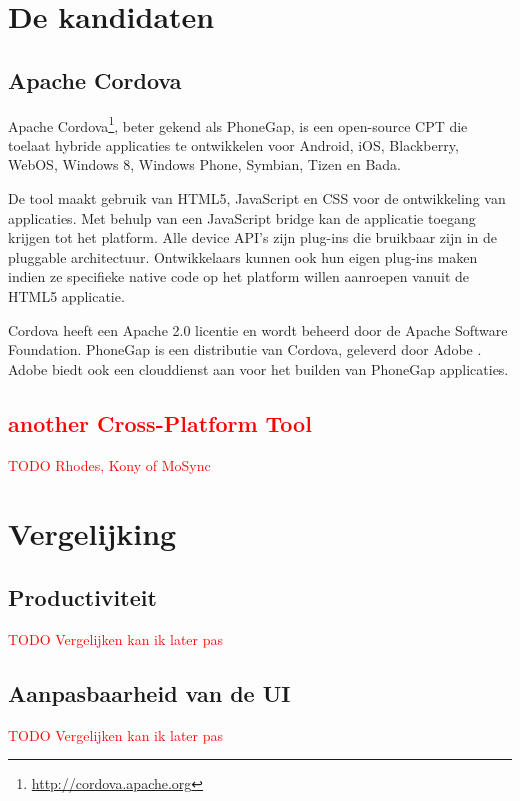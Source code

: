 \documentclass[a4paper]{IEEEconf}
\newcommand{\anotherCPT}{\textcolor{red}{another Cross-Platform Tool}}
\newcommand{\TODO}[1]{\textcolor{red}{TODO #1}}
\begin{document}
\section{De kandidaten}

\subsection{Apache Cordova}

Apache Cordova\footnote{\url{http://cordova.apache.org}}, beter gekend als PhoneGap, is een open-source CPT die toelaat hybride applicaties te ontwikkelen voor Android, iOS, Blackberry, WebOS, Windows 8, Windows Phone, Symbian, Tizen en Bada.

De tool maakt gebruik van HTML5, JavaScript en CSS voor de ontwikkeling van applicaties. Met behulp van een JavaScript bridge kan de applicatie toegang krijgen tot het platform. Alle device API's zijn plug-ins die bruikbaar zijn in de pluggable architectuur. Ontwikkelaars kunnen ook hun eigen plug-ins maken indien ze specifieke native code op het platform willen aanroepen vanuit de HTML5 applicatie.

Cordova heeft een Apache 2.0 licentie en wordt beheerd door de Apache Software Foundation. PhoneGap is een distributie van Cordova, geleverd door Adobe \cite{LeRoux:2012}. Adobe biedt ook een clouddienst aan voor het builden van PhoneGap applicaties. 

\subsection{\anotherCPT}

\TODO{Rhodes, Kony of MoSync}

\section{Vergelijking}

\subsection{Productiviteit}

\TODO{Vergelijken kan ik later pas}

\subsection{Aanpasbaarheid van de UI}

\TODO{Vergelijken kan ik later pas}
\end{document}

